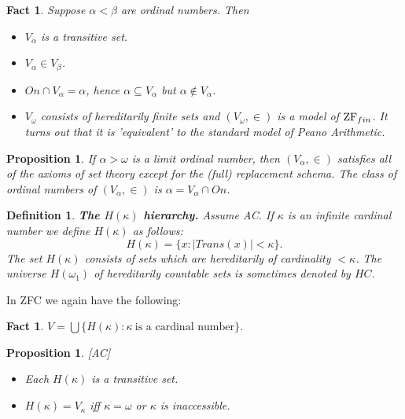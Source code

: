 \documentclass[a4paper,11pt,oneside]{mybook}
\theoremstyle{theorem}
\newtheorem{proposition}[subsection]{Proposition}
\newtheorem{fact}[subsection]{Fact}
\newtheorem{definition}[subsection]{Definition}
\theoremstyle{example}
\begin{document}
{\begin{fact}\label{valphaFact} Suppose $\alpha<\beta$ are ordinal numbers. Then
 \begin{itemize}
  \item[(i)] $V_\alpha$ is a transitive set.
  \item[(ii)] $V_\alpha\in V_\beta$.
  \item[(iii)] $On\cap V_\alpha = \alpha$, hence $\alpha\subseteq V_\alpha$ but $\alpha\not\in V_\alpha$.
  \item[(iv)] $V_\omega$ consists of hereditarily finite sets and $(V_\omega,\in)$ is a model of $\hbox{ZF}_{fin}$.
              It turns out that it is 'equivalent' to the standard model of Peano Arithmetic.
 \end{itemize}
\end{fact}

\begin{proposition}\label{valphaApprox} If $\alpha>\omega$ is a limit ordinal number, then $(V_\alpha,\in)$ satisfies all of the axioms
 of set theory except for the (full) replacement schema. The class of ordinal numbers of $(V_\alpha,\in)$ is
 $\alpha=V_\alpha\cap On$.
\end{proposition}


\begin{definition}\label{H-kappa}{\bf The $H(\kappa)$ hierarchy.} Assume AC. If $\kappa$ is an infinite cardinal number we define
$H(\kappa)$ as follows:
$$ %
 H(\kappa) = \{x:|Trans(x)|<\kappa\}.
$$ %
The set $H(\kappa)$ consists of sets which are hereditarily of cardinality $<\kappa$. The universe $H(\omega_1)$ of hereditarily countable
sets is sometimes denoted by $HC$.
\end{definition}

In ZFC we again have the following:

\begin{fact} $V=\bigcup\{H(\kappa):\kappa\ \mbox{is a cardinal number}\}$.
\end{fact}

\begin{proposition}{\rm [AC]}
 \begin{itemize}
  \item[(i)] Each $H(\kappa)$ is a transitive set.
  \item[(ii)] $H(\kappa)=V_\kappa$ iff $\kappa=\omega$ or $\kappa$ is inaccessible.
 \end{itemize}
\end{proposition}

}
\end{document}
